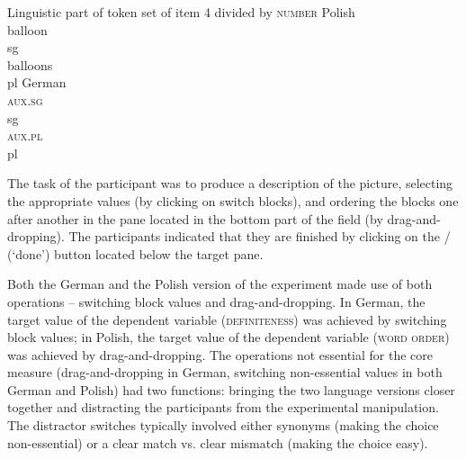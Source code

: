 \documentclass[output=paper]{langscibook}
\begin{document}
\ea Linguistic part of token set of item 4 divided by \textsc{number}\label{sim-dem:ex:window}
\ea Polish
\ea\gll {}  \\
\hspace{4pt}balloon \hspace{4pt}{him | her} \\\hfill\textsf{sg}
\ex\gll {}  \\
\hspace{4pt}balloons \hspace{4pt}{him | her} \\\hfill\textsf{pl}
\z
\ex German
\ea\gll {}   \\
\hspace{4pt}{the balloon | a balloon} \hspace{4pt}\textsc{aux.sg} \hspace{4pt}{him | her} \hspace{4pt}{flew.away}\\\hfill\textsf{sg}
\ex\gll {}  \hspace{.5cm} \\
\hspace{4pt}{the balloons | balloons} \hspace{4pt}\textsc{aux.pl} \hspace{4pt}{him | her} \hspace{4pt}{flew.away}\\\hfill\textsf{pl}
\z
\z\z

\noindent The task of the participant was to produce a description of the picture, selecting the appropriate values (by clicking on switch blocks), and ordering the blocks one after another in the pane located in the bottom part of the field (by drag-and-dropping). The participants indicated that they are finished by clicking on the  /  (`done') button located below the target pane.

Both the German and the Polish version of the experiment made use of both operations -- switching block values and drag-and-dropping. In German, the target value of the dependent variable (\textsc{definiteness}) was achieved by switching block values; in Polish, the target value of the dependent variable (\textsc{word order}) was achieved by drag-and-dropping. The operations not essential for the core measure (drag-and-dropping in German, switching non-essential values in both German and Polish) had two functions: bringing the two language versions closer together and distracting the participants from the experimental manipulation. The distractor switches typically involved either synonyms (making the choice non-essential) or a clear match vs. clear mismatch (making the choice easy).
\end{document}
